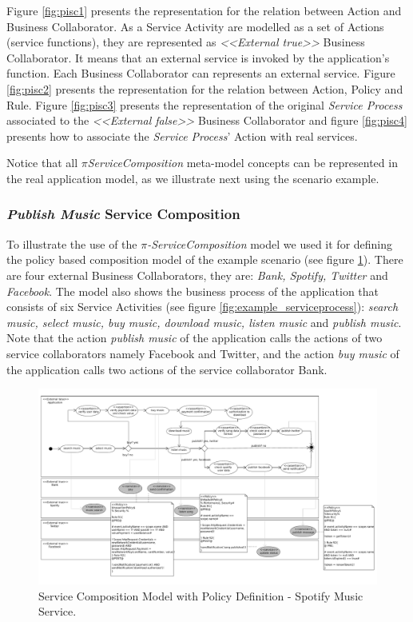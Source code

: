 Figure \ref{fig:pisc1} presents the representation for the relation between
{\sc Action} and {\sc Business Collaborator}. As a {\sc Service Activity} are
modelled as a set of {\sc Actions} (service functions), they are represented as
\textit{<<External true>>} {\sc Business Collaborator}. It means that an
external service is invoked by the application's function. Each {\sc Business
Collaborator} can represents an external service. Figure \ref{fig:pisc2}
presents the representation for the relation between {\sc Action}, {\sc Policy} and {\sc
Rule}. Figure \ref{fig:pisc3} presents the representation of the original
\textit{Service Process} associated to the \textit{<<External false>>} {\sc
Business Collaborator} and figure \ref{fig:pisc4} presents how to associate the
\textit{Service Process}' {\sc Action} with real services.

Notice that all \textit{$\pi$ServiceComposition} meta-model concepts can be
represented in the real application model, as we illustrate next using the
scenario example.

\subsubsection{\textit{Publish Music} Service Composition}

To illustrate the use of the \textit{$\pi$-ServiceComposition} model we used it for
defining the policy based composition model of the example scenario (see figure
\ref{fig:servicecompositionPolicy}). There are four external {\sc Business
Collaborators}, they are: \textit{Bank, Spotify, Twitter} and \textit{Facebook}.
The model also shows the business process of the application that consists of
six {\sc Service Activities} (see figure \ref{fig:example_serviceprocess}):
\textit{search music, select music, buy music, download music, listen music} and
\textit{publish music}. Note that the action \textit{publish music} of the
application calls the actions of two service collaborators namely Facebook and
Twitter, and the action \textit{buy music} of the application calls two actions
of the service collaborator Bank.

\begin{figure}[ht!]
\centering
\includegraphics[width=.99\textwidth]{chapters/methodology/figs/runningExampleServiceComposition.pdf}
\caption{Service Composition Model with Policy Definition - Spotify Music
Service.}
\label{fig:servicecompositionPolicy}
\end{figure}


